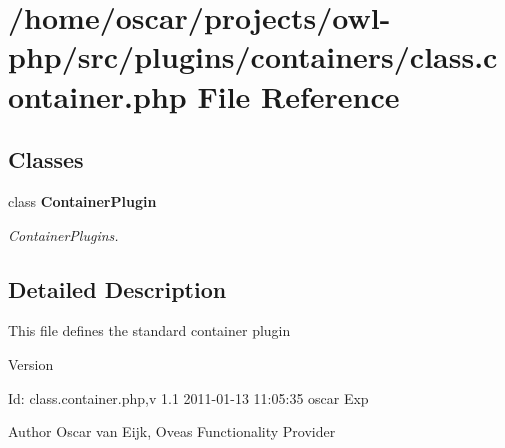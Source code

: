 \section{/home/oscar/projects/owl-\/php/src/plugins/containers/class.container.php File Reference}
\label{plugins_2containers_2class_8container_8php}
\subsection*{Classes}
\begin{DoxyCompactItemize}
\item 
class {\bf ContainerPlugin}
\begin{DoxyCompactList}\small\item\em ContainerPlugins. \end{DoxyCompactList}\end{DoxyCompactItemize}


\subsection{Detailed Description}
This file defines the standard container plugin \begin{DoxyVersion}{Version}

\end{DoxyVersion}
\begin{DoxyParagraph}{Id:}
class.container.php,v 1.1 2011-\/01-\/13 11:05:35 oscar Exp 
\end{DoxyParagraph}
\begin{DoxyAuthor}{Author}
Oscar van Eijk, Oveas Functionality Provider 
\end{DoxyAuthor}
